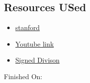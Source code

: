 \documentclass{article}
\begin{document}
\subsection{Resources USed}
\begin{itemize}
    \item \href{https://web.stanford.edu/class/ee486/doc/chap5.pdf}{stanford}
    \item \href{https://www.youtube.com/watch?v=6ToR6vuRb3M}{Youtube link}
    \item \href{https://www.researchgate.net/publication/319302625_Hardware_implementation_of_methodologies_of_fixed_point_division_algorithms}{Signed Divison}
\end{itemize}


Finished On: \date{20-06-2021}
\end{document}

